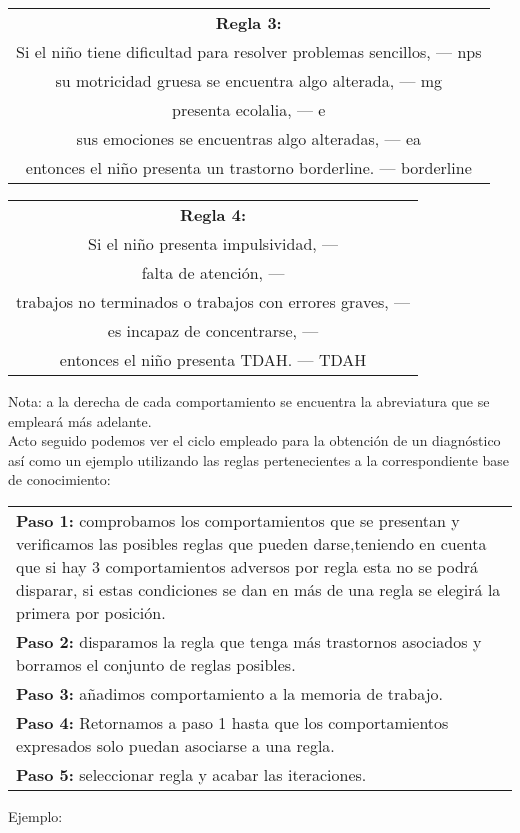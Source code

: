\documentclass[letterpaper,12pt]{article}
\begin{document}
\begin{center}
\begin{tabular}{|c|}
\hline 
\textbf{Regla 3:} \\
Si el niño tiene dificultad para resolver problemas sencillos, — nps\\
su motricidad gruesa se encuentra algo alterada, — mg\\
presenta ecolalia, — e\\
sus emociones se encuentras algo alteradas, — ea\\
entonces el niño presenta un trastorno borderline. — borderline \\ 
\hline 
\end{tabular} 
\end{center}

\begin{center}
\begin{tabular}{|c|}
\hline 
\textbf{Regla 4:} \\
Si el niño presenta impulsividad, — \\
falta de atención, — \\
trabajos no terminados o trabajos con errores graves, — \\
es incapaz de concentrarse, — \\
entonces el niño presenta TDAH. — TDAH \\ 
\hline 
\end{tabular} 
\end{center}

Nota: a la derecha de cada comportamiento se encuentra la abreviatura que
se empleará más adelante. \\

Acto seguido podemos ver el ciclo empleado para la obtención de un
diagnóstico así como un ejemplo utilizando las reglas pertenecientes a la correspondiente base de conocimiento: \\

\begin{center}
\begin{tabular}{|p{15cm}|}
\hline 
\textbf{Paso 1:} comprobamos los comportamientos que se presentan y verificamos las posibles reglas que pueden darse,teniendo en cuenta que si hay 3 comportamientos adversos por regla esta no se podrá disparar, si estas condiciones se dan en más de una regla se elegirá la primera por posición. \\
\textbf{Paso 2:} disparamos la regla que tenga más trastornos asociados y borramos el conjunto de reglas posibles.\\
\textbf{Paso 3:} añadimos comportamiento a la memoria de trabajo. \\
\textbf{Paso 4:} Retornamos a paso 1 hasta que los comportamientos expresados solo puedan asociarse a una regla.\\
\textbf{Paso 5:} seleccionar regla y acabar las iteraciones. \\ 
\hline 
\end{tabular} 
\end{center}
\newpage
Ejemplo: \\
\end{document}
